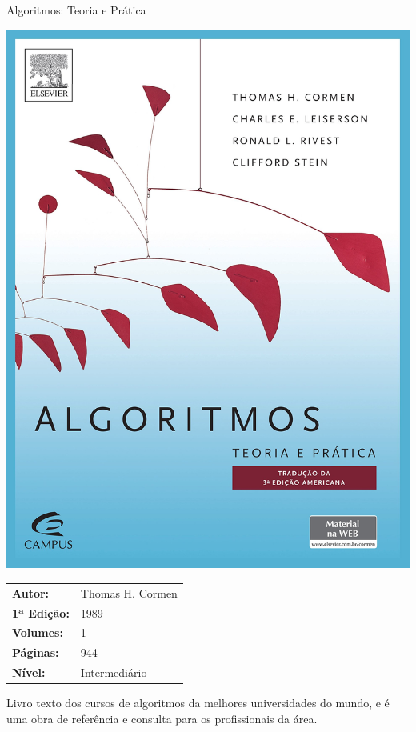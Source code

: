 \begin{frame}[fragile]{Algoritmos: Teoria e Prática}

    \begin{minipage}{0.4\textwidth}
        \includegraphics[scale=0.05]{cormen.jpg}
    \end{minipage}
    \begin{minipage}{0.5\textwidth}
        \begin{small}
            \begin{tabularx}{0.98\textwidth}{lX}
                \textbf{Autor:} & Thomas H. Cormen \\
                \textbf{1ª Edição:} & 1989  \\
                \textbf{Volumes:} & 1 \\
                \textbf{Páginas:} & 944 \\
                \textbf{Nível:} & Intermediário \\
            \end{tabularx}
        \end{small}
    \end{minipage}

    \vspace{0.2in} 

    Livro texto dos cursos de algoritmos da melhores universidades do mundo, e é uma obra
    de referência e consulta para os profissionais da área. 

\end{frame}

